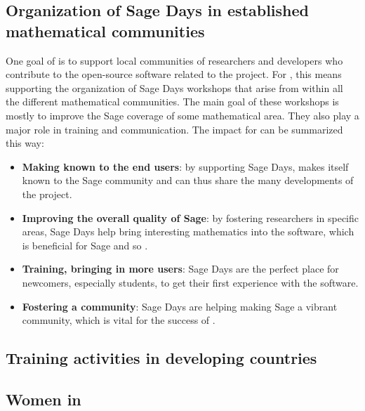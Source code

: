 \documentclass{deliverablereport}
\begin{document}






\subsection{Organization of Sage Days in established mathematical communities}

One goal of \ODK is to support local communities of researchers
and developers who contribute to the open-source software related to
the project. For \Sage, this means supporting the organization of Sage Days
workshops that arise from within all the different mathematical communities. The main 
goal of these workshops is mostly to improve the Sage coverage of some mathematical
area. They also play a major role in training and communication. The
impact for \ODK can be summarized this way:

\begin{itemize}
\item \textbf{Making \ODK known to the end users}: by supporting Sage Days,
\ODK makes itself known to the Sage community and can
thus share the many developments of the project.

\item \textbf{Improving the overall quality of Sage}: by fostering researchers
in specific areas, Sage Days help bring interesting mathematics into
the software, which is beneficial for Sage and so \ODK.

\item \textbf{Training, bringing in more users}: Sage Days are the perfect place
for newcomers, especially students, to get their first experience with the software.

\item \textbf{Fostering a community}: Sage Days are helping making Sage a vibrant
community, which is vital for the success of \ODK.
\end{itemize}



\subsection{Training activities in developing countries}



\subsection{Women in \ODK}
\end{document}
